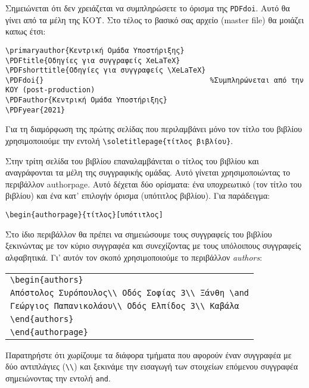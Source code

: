 \begin{refsection}
Σημειώνεται ότι δεν χρειάζεται να συμπληρώσετε το όρισμα της \verb|PDFdoi|. Αυτό θα γίνει από τα μέλη
της ΚΟΥ. Στο τέλος το βασικό σας αρχείο (master file) θα μοιάζει καπως έτσι:
\begin{verbatim}
\primaryauthor{Κεντρική Ομάδα Υποστήριξης}
\PDFtitle{Οδηγίες για συγγραφείς XeLaTeX}
\PDFshorttitle{Οδηγίες για συγγραφείς \XeLaTeX}
\PDFdoi{}                                       %Συμπληρώνεται από την ΚΟΥ (post-production)
\PDFauthor{Κεντρική Ομάδα Υποστήριξης}
\PDFyear{2021}
\end{verbatim}

Για τη διαμόρφωση της πρώτης σελίδας που περιλαμβάνει μόνο τον τίτλο του βιβλίου χρησιμοποιούμε την εντολή
\verb|\soletitlepage{τίτλος βιβλίου}|.

Στην τρίτη σελίδα του βιβλίου επαναλαμβάνεται ο τίτλος του βιβλίου και αναγράφονται τα μέλη της συγγραφικής ομάδας. Αυτό γίνεται χρησιμοποιώντας το περιβάλλον authorpage. Αυτό δέχεται δύο ορίσματα: ένα υποχρεωτικό (τον τίτλο του βιβλίου) και ένα κατ’ επιλογήν όρισμα (υπότιτλος βιβλίου). Για παράδειγμα:
\begin{center}
\verb|\begin{authorpage}{τίτλος}[υπότιτλος]|
\end{center}
Στο ίδιο περιβάλλον θα πρέπει να σημειώσουμε τους συγγραφείς του βιβλίου ξεκινώντας με τον κύριο συγγραφέα
και συνεχίζοντας με τους υπόλοιπους συγγραφείς αλφαβητικά. Γι' αυτόν τον σκοπό  χρησιμοποιούμε το περιβάλλον
\emph{authors}:
\begin{center}
\begin{tabular}{l}
\verb=\begin{authors}=\\
\verb=Απόστολος Συρόπουλος\\ Οδός Σοφίας 3\\ Ξάνθη \and=\\
\verb=Γεώργιος Παπανικολάου\\ Οδός Ελπίδος 3\\ Καβάλα=\\
\verb=\end{authors}=\\
\verb=\end{authorpage}=
\end{tabular}
\end{center}
Παρατηρήστε ότι χωρίζουμε τα διάφορα τμήματα που αφορούν έναν συγγραφέα με δύο αντιπλάγιες (\verb=\\=) και ξεκινάμε την εισαγωγή των στοιχείων επόμενου συγγραφέα σημειώνοντας την εντολή \verb|and|.


\end{refsection}
